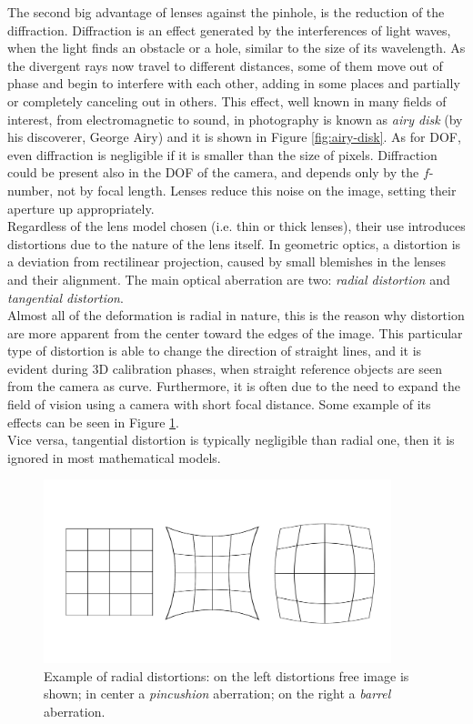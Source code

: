 The second big advantage of lenses against the pinhole, is the reduction of the diffraction. Diffraction is an effect generated by the interferences of light waves, when the light finds an obstacle or a hole, similar to the size of its wavelength. As the divergent rays now travel to different distances, some of them move out of phase and begin to interfere with each other, adding in some places and partially or completely canceling out in others. This effect, well known in many fields of interest, from electromagnetic to sound, in photography is known as \textit{airy disk} (by his discoverer, George Airy) and it is shown in Figure \ref{fig:airy-disk}. As for \acs{DOF}, even diffraction is negligible if it is smaller than the size of pixels. Diffraction could be present also in the \acs{DOF} of the camera, and depends only by the $f$-number, not by focal length. Lenses reduce this noise on the image, setting their aperture up appropriately. \\

Regardless of the lens model chosen (i.e. thin or thick lenses), their use introduces distortions due to the nature of the lens itself. In geometric optics, a distortion is a deviation from rectilinear projection, caused by small blemishes in the lenses and their alignment. The main optical aberration are two: \textit{radial distortion} and \textit{tangential distortion}. \\
Almost all of the deformation is radial in nature, this is the reason why distortion are more apparent from the center toward the edges of the image. This particular type of distortion is able to change the direction of straight lines, and it is evident during 3D calibration phases, when straight reference objects are seen from the camera as curve. Furthermore, it is often due to the need to expand the field of vision using a camera with short focal distance. Some example of its effects can be seen in Figure \ref{fig:teo-distorsions}. \\
Vice versa, tangential distortion is typically negligible than radial one, then it is ignored in most mathematical models.
  \begin{figure}[h!]
    \centering
 \includegraphics[width=0.9\textwidth]{./images/tech/distorsions.png}
    \caption{Example of radial distortions: on the left distortions free image is shown; in center a \textit{pincushion} aberration; on the right a \textit{barrel} aberration.}
    \label{fig:teo-distorsions}
  \end{figure}

